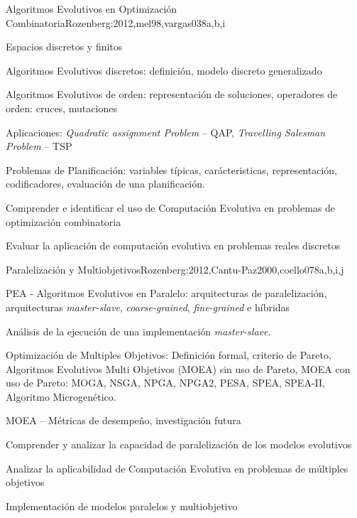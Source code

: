 \begin{syllabus}
\begin{unit}{Algoritmos Evolutivos en Optimización Combinatoria}{}{Rozenberg:2012,mel98,vargas03}{8}{a,b,i}
\begin{topics}
  \item Espacios discretos y finitos
	\item Algoritmos Evolutivos discretos: definición, modelo discreto generalizado
  \item Algoritmos Evolutivos de orden: representación de soluciones, operadores de orden: cruces, mutaciones
	\item Aplicaciones: \textit{Quadratic assignment Problem} -- QAP, \textit{Travelling Salesman Problem} -- TSP
	\item Problemas de Planificación: variables típicas, carácteristicas, representación, codificadores, evaluación de una planificación. 
\end{topics}
\begin{learningoutcomes}
  \item Comprender e identificar el uso de Computación Evolutiva en problemas de optimización combinatoria
  \item Evaluar la aplicación de computación evolutiva en problemas reales discretos
\end{learningoutcomes}
\end{unit}

\begin{unit}{Paralelización y Multiobjetivos}{}{Rozenberg:2012,Cantu-Paz2000,coello07}{8}{a,b,i,j}
\begin{topics}
  \item PEA - Algoritmos Evolutivos en Paralelo: arquitecturas de paralelización, arquitecturas \textit{master-slave}, \textit{coarse-grained}, \textit{fine-grained} e híbridas 
  \item Análisis de la ejecución de una implementación \textit{master-slave}.
  \item Optimización de Multiples Objetivos: Definición formal, criterio de Pareto, Algoritmos Evolutivos Multi Objetivos (MOEA) sin uso de Pareto, MOEA con uso de Pareto: MOGA, NSGA, NPGA, NPGA2, PESA, SPEA, SPEA-II, Algoritmo Microgenético. 
	\item MOEA -- Métricas de desempeño, investigación futura
\end{topics}
\begin{learningoutcomes}
  \item Comprender y analizar la capacidad de paralelización de los modelos evolutivos
  \item Analizar la aplicabilidad de Computación Evolutiva en problemas de múltiples objetivos
  \item Implementación de modelos paralelos y multiobjetivo
\end{learningoutcomes}
\end{unit}


\end{syllabus}
